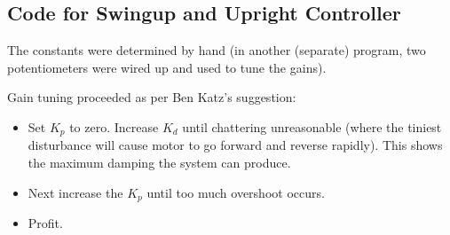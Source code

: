 \documentclass[conference]{IEEEtran}
\begin{document}
\subsection{Code for Swingup and Upright Controller}

The constants were determined by hand (in another (separate) program, two
potentiometers were wired up and used to tune the gains). 

Gain tuning proceeded as per Ben Katz's suggestion:
\begin{itemize}
    \item Set $K_p$ to zero. Increase $K_d$ until chattering unreasonable (where the
tiniest disturbance will cause motor to go forward and reverse rapidly). This
shows the maximum damping the system can produce.
\item  Next increase the $K_p$ until too much overshoot occurs.
\item  Profit.
\end{itemize}
\end{document}
